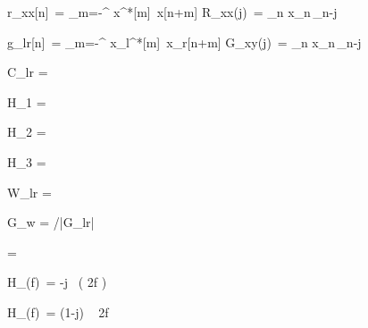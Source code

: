 
r_{xx}[n]\ = \sum_{m=-\infty}^{\infty} x^*[m]\ x[n+m]
R_{xx}(j)\ = \sum_n x_n\,_{n-j}

g_{lr}[n]\ = \sum_{m=-\infty}^{\infty} x_l^*[m]\ x_r[n+m]
G_{xy}(j)\ = \sum_n x_n\,_{n-j}

C_{lr} = 

H_1 = 

H_2 = 

H_3 = 

W_{lr} = 


G_w = /{|G_{lr}|}


\alpha = 

H_(f)\ = -j \ \tan \left( 2\pi f  \right)

H_(f)\ = (1-j) \  { 2\pi f  }